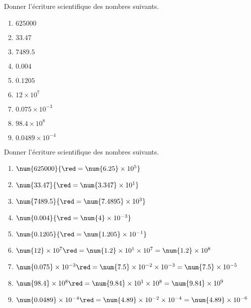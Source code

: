 \begin{exercice*}
    Donner l'écriture scientifique des nombres suivants.
    \begin{multicols}{2}
        \begin{enumerate}       
            \item $\num{625000}$
            \item $\num{33.47}$
            \item $\num{7489.5}$
            \item $\num{0.004}$
            \item $\num{0.1205}$
            \item $\num{12}\times 10^7$
            \item $\num{0.075}\times 10^{-3}$
            \item $\num{98.4}\times 10^8$
            \item $\num{0.0489}\times 10^{-4}$
        \end{enumerate}
    \end{multicols}
    
\end{exercice*}
\begin{corrige}
    Donner l'écriture scientifique des nombres suivants.
    \begin{enumerate}       
        \item $\num{625000}                 {\red =\num{6.25}\times 10^{5}}$
        \item $\num{33.47}                  {\red =\num{3.347}\times 10^{1}}$
        \item $\num{7489.5}                 {\red =\num{7.4895}\times 10^{3}}$
        \item $\num{0.004}                  {\red =\num{4}\times 10^{-3}}$
        \item $\num{0.1205}                 {\red =\num{1.205}\times 10^{-1}}$
        \item $\num{12}\times 10^7          {\red =\num{1.2}\times 10^{1}\times 10^7=\num{1.2}\times 10^8}$
        \item $\num{0.075}\times 10^{-3}    {\red =\num{7.5}\times 10^{-2}\times 10^{-3}=\num{7.5}\times 10^{-5}}$
        \item $\num{98.4}\times 10^8        {\red =\num{9.84}\times 10^{1}\times 10^8=\num{9.84}\times 10^{9}}$
        \item $\num{0.0489}\times 10^{-4}   {\red =\num{4.89}\times 10^{-2}\times 10^{-4}=\num{4.89}\times 10^{-6}}$
    \end{enumerate}
\end{corrige}

